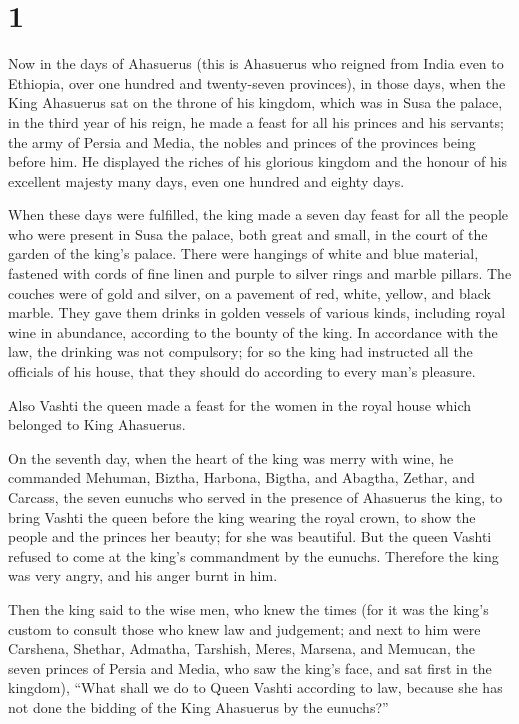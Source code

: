 \hypertarget{section}{%
\section{1}\label{section}}

 Now in the days of Ahasuerus (this is Ahasuerus who reigned
from India even to Ethiopia, over one hundred and twenty-seven
provinces),  in those days, when the King Ahasuerus sat on
the throne of his kingdom, which was in Susa the palace,  in
the third year of his reign, he made a feast for all his princes and his
servants; the army of Persia and Media, the nobles and princes of the
provinces being before him.  He displayed the riches of his
glorious kingdom and the honour of his excellent majesty many days, even
one hundred and eighty days.

 When these days were fulfilled, the king made a seven day
feast for all the people who were present in Susa the palace, both great
and small, in the court of the garden of the king's palace. 
There were hangings of white and blue material, fastened with cords of
fine linen and purple to silver rings and marble pillars. The couches
were of gold and silver, on a pavement of red, white, yellow, and black
marble.  They gave them drinks in golden vessels of various
kinds, including royal wine in abundance, according to the bounty of the
king.  In accordance with the law, the drinking was not
compulsory; for so the king had instructed all the officials of his
house, that they should do according to every man's pleasure.

 Also Vashti the queen made a feast for the women in the
royal house which belonged to King Ahasuerus.

 On the seventh day, when the heart of the king was merry
with wine, he commanded Mehuman, Biztha, Harbona, Bigtha, and Abagtha,
Zethar, and Carcass, the seven eunuchs who served in the presence of
Ahasuerus the king,  to bring Vashti the queen before the
king wearing the royal crown, to show the people and the princes her
beauty; for she was beautiful.  But the queen Vashti
refused to come at the king's commandment by the eunuchs. Therefore the
king was very angry, and his anger burnt in him.

 Then the king said to the wise men, who knew the times
(for it was the king's custom to consult those who knew law and
judgement;  and next to him were Carshena, Shethar,
Admatha, Tarshish, Meres, Marsena, and Memucan, the seven princes of
Persia and Media, who saw the king's face, and sat first in the
kingdom),  ``What shall we do to Queen Vashti according to
law, because she has not done the bidding of the King Ahasuerus by the
eunuchs?''

